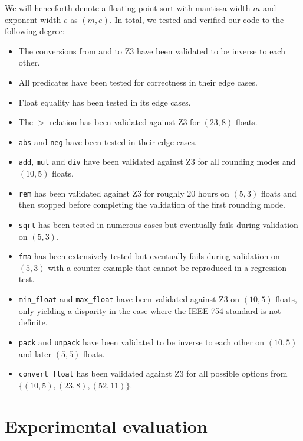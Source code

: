 \documentclass[a4paper,UKenglish,cleveref, autoref, thm-restate]{lipics-v2019}
\begin{document}
We will henceforth denote a floating point sort with mantissa width $m$ and exponent width $e$ as $(m, e)$. In total, we tested and verified our code to the following degree:
\begin{itemize}
	\item The conversions from and to Z3 have been validated to be inverse to each other.
	\item All predicates have been tested for correctness in their edge cases.
	\item Float equality has been tested in its edge cases.
	\item The $>$ relation has been validated against Z3 for $(23, 8)$ floats.
	\item \verb|abs| and \verb|neg| have been tested in their edge cases.
	\item \verb|add|, \verb|mul| and \verb|div| have been validated against Z3 for all rounding modes and $(10, 5)$ floats.
	\item \verb|rem| has been validated against Z3 for roughly 20 hours on $(5, 3)$ floats and then stopped before completing the validation of the first rounding mode.
	\item \verb|sqrt| has been tested in numerous cases but eventually fails during validation on $(5, 3)$.
	\item \verb|fma| has been extensively tested but eventually fails during validation on $(5, 3)$ with a counter-example that cannot be reproduced in a regression test.
	\item \verb|min_float| and \verb|max_float| have been validated against Z3 on $(10, 5)$ floats, only yielding a disparity in the case where the IEEE 754 standard is not definite.
	\item \verb|pack| and \verb|unpack| have been validated to be inverse to each other on $(10, 5)$ and later $(5, 5)$ floats.
	\item \verb|convert_float| has been validated against Z3 for all possible options from \\ $\{(10, 5), (23, 8), (52, 11)\}$.
\end{itemize}

\section{Experimental evaluation}
\end{document}
